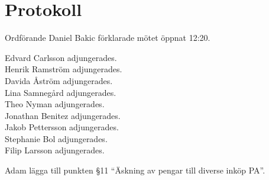 \documentclass[10pt]{article}
\def\mo{Daniel Bakic}
\begin{document}
\section*{Protokoll}
\begin{paragrafer}
	Ordförande {\mo} förklarade mötet öppnat 12:20.

	{\valavmo}

	{\valavms}

	{\valavj}

	{\tosg}


	Edvard Carlsson adjungerades. \\
    Henrik Ramström adjungerades. \\
    Davida Åström adjungerades. \\
    Lina Samnegård adjungerades. \\
    Theo Nyman adjungerades. \\
	Jonathan Benitez adjungerades. \\
	Jakob Pettersson adjungerades. \\
	Stephanie Bol adjungerades. \\
	Filip Larsson adjungerades.


	Adam \ypa lägga till punkten \S11 ``Äskning av pengar till diverse inköp PA''.



	\begin{fyllnadsval} %


\end{fyllnadsval}
\end{paragrafer}
\end{document}
